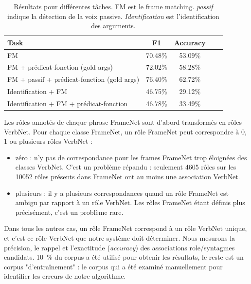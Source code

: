 \begin{table}[ht]
    \centering
    \begin{tabular}{lcccc}
        \toprule
        Task                                           & F1        & Accuracy \\
        \midrule
        FM                                             & 70.48\%   & 53.09\%  \\
        FM + prédicat-fonction (gold args)                & 72.02\%   & 58.28\%  \\
        FM + passif + prédicat-fonction (gold args)      & 76.40\%   & 62.72\%  \\
        \midrule
        Identification + FM                            & 46.75\%   & 29.12\%  \\
        Identification + FM + prédicat-fonction           & 46.78\%   & 33.49\%  \\
        \bottomrule
    \end{tabular}
    \caption{\protect\centering\label{table:results}Résultats pour différentes tâches. FM est le frame matching. \emph{passif} indique la détection de la voix passive. \emph{Identification} est l'identification des arguments.}
\end{table}

Les rôles annotés de chaque phrase FrameNet sont d'abord transformés en rôles
VerbNet. Pour chaque classe FrameNet, un rôle FrameNet peut correspondre à 0, 1
ou plusieurs rôles VerbNet :

\begin{itemize}

    \item zéro : n'y pas de correspondance pour les frames FrameNet trop éloignées
    des classes VerbNet. C'est un problème répandu :  seulement 4605 rôles sur les
    10052 rôles présents dans FrameNet ont au moins une association VerbNet.

    \item plusieurs : il y a plusieurs correspondances quand un rôle FrameNet
    est ambigu par rapport à un rôle VerbNet. Les rôles FrameNet étant définis plus
    précisément, c'est un problème rare. %

\end{itemize}

Dans tous les autres cas, un rôle FrameNet correspond à un rôle VerbNet unique,
et c'est ce rôle VerbNet que notre système doit déterminer. Nous mesurons la
précision, le rappel et l'exactitude (\emph{accuracy}) des associations
role/syntagmes candidats.  10~\% du corpus a été utilisé pour obtenir les
résultats, le reste est un corpus "d'entraînement" : le corpus qui a été
examiné manuellement pour identifier les erreurs de notre algorithme.

